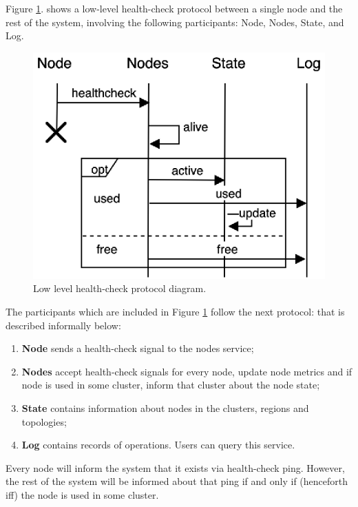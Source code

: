 Figure \ref{fig:fig6}. shows a low-level health-check protocol between a single node and the rest of the system, involving the following participants: Node, Nodes, State, and Log.

\begin{figure}[H]
	\begin{center}
		\includegraphics[scale=0.75]{images/FIG2}
	\end{center}
	\vspace{-0.7cm}
	\caption{Low level health-check protocol diagram.}
	\label{fig:fig6}
\end{figure} 

The participants which are included in Figure \ref{fig:fig6} follow the next protocol:\label{informal_description_health-check} that is described informally below:

\begin{enumerate}[start=1,label={(\bfseries \arabic*)}]
\item \textbf{Node} sends a health-check signal to the nodes service;
\item \textbf{Nodes} accept health-check signals for every node, update node metrics and if node is used in some cluster, inform that cluster about the node state;
\item \textbf{State} contains information about nodes in the clusters, regions and topologies;
\item \textbf{Log} contains records of operations. Users can query this service. 
\end{enumerate}

Every node will inform the system that it exists via health-check ping. However, the rest of the system will be informed about that ping if and only if (henceforth iff) the node is used in some cluster. 


